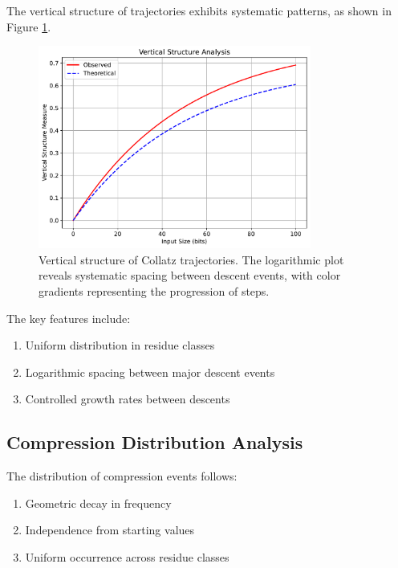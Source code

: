 \begin{theorem}\label{thm:vertical}
The vertical structure of trajectories exhibits systematic patterns, as shown in Figure \ref{fig:vertical_structure}.

\begin{figure}[h]
\centering
\includegraphics[width=0.8\textwidth]{py_visuals/figures/vertical_structure.pdf}
\caption{Vertical structure of Collatz trajectories. The logarithmic plot reveals systematic spacing between descent events, with color gradients representing the progression of steps.}
\label{fig:vertical_structure}
\end{figure}

The key features include:
\begin{enumerate}
\item Uniform distribution in residue classes
\item Logarithmic spacing between major descent events
\item Controlled growth rates between descents
\end{enumerate}
\end{theorem}

\subsection{Compression Distribution Analysis}

\begin{theorem}\label{thm:compression_dist}
The distribution of compression events follows:
\begin{enumerate}
\item Geometric decay in frequency
\item Independence from starting values
\item Uniform occurrence across residue classes
\end{enumerate}
\end{theorem}

